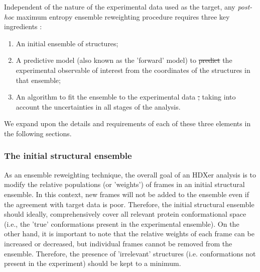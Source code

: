 \documentclass[9pt,tutorial]{livecoms}
\providecommand{\DIFadd}[1]{{\protect\color{blue}\uwave{#1}}} %
\providecommand{\DIFdel}[1]{{\protect\color{red}\sout{#1}}}                      %
\providecommand{\DIFaddbegin}{} %
\providecommand{\DIFaddend}{} %
\providecommand{\DIFdelbegin}{} %
\providecommand{\DIFdelend}{} %
\begin{document}
Independent of the nature of the experimental data used as the target, any \textit{post-hoc} maximum entropy ensemble reweighting procedure requires three key ingredients \cite{Orioli2020}:

\begin{enumerate}
\item An initial ensemble of structures;
\item A predictive model (also known as the 'forward' model) to \DIFdelbegin \DIFdel{predict }\DIFdelend \DIFaddbegin \DIFadd{compute }\DIFaddend the experimental observable of interest from the coordinates of the structures in that ensemble;
\item An algorithm to fit the ensemble to the experimental data \DIFdelbegin \DIFdel{, }\DIFdelend \DIFaddbegin \DIFadd{while }\DIFaddend taking into account the uncertainties in all stages of the analysis. 
\end{enumerate}
We expand upon the details and requirements of each of these three elements in the following sections.

\subsubsection{The initial structural ensemble}\label{initialensemble_sect}
As an ensemble reweighting technique, the overall goal of an HDXer analysis is to modify the relative populations (or 'weights') of frames in an initial structural ensemble.
In this context, new frames will not be added to the ensemble even if the agreement with target data is poor. 
Therefore, the initial structural ensemble should ideally, comprehensively cover all relevant protein conformational space (i.e., the 'true' conformations present in the experimental ensemble).
On the other hand, it is important to note that the relative weights of each frame can be increased or decreased, but \DIFaddbegin \DIFadd{that }\DIFaddend individual frames cannot be removed from the ensemble. 
Therefore, the presence of 'irrelevant' structures (i.e. conformations not present in the experiment) should be kept to a minimum.
\end{document}
